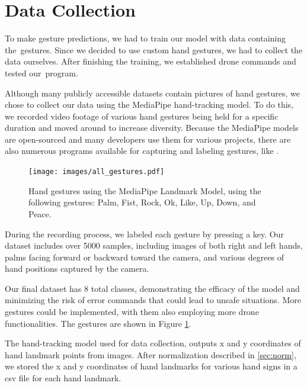 \section{Data Collection}

To make gesture predictions, we had to train our model with data containing the~gestures. Since we decided to use custom hand gestures, we had to collect the data ourselves. After finishing the training, we established drone commands and tested our~program.

Although many publicly accessible datasets contain pictures of hand gestures, we chose to collect our data using the MediaPipe hand-tracking model. To do this, we recorded video footage of various hand gestures being held for a specific duration and moved around to increase diversity. Because the MediaPipe models are open-sourced and many developers use them for various projects, there are also numerous programs available for capturing and labeling gestures, like \cite{opencv_mediapipe_hand_gesture_recognition}.
\begin{figure}[h!]
	\centering
	\texttt{[image: images/all\_gestures.pdf]}
	\caption{Hand gestures using the MediaPipe Landmark Model, using the following gestures: Palm, Fist, Rock, Ok, Like, Up, Down, and Peace.}
	\label{fig:all_gestures}
\end{figure}


 During the recording process, we labeled each gesture by pressing a key. Our dataset includes over 5000 samples, including images of both right and left hands, palms facing forward or backward toward the camera, and various degrees of hand positions captured by the camera.



Our final dataset has 8 total classes, demonstrating the efficacy of the model and minimizing the risk of error commands that could lead to unsafe situations.
More gestures could be implemented, with them also employing more drone functionalities.
The gestures are shown in Figure \ref{fig:all_gestures}.


The hand-tracking model used for data collection, outputs x and y coordinates of hand landmark points from images. After normalization described in \ref{sec:norm}, we stored the x and y coordinates of hand landmarks for various hand signs in a csv file for each hand landmark. 




